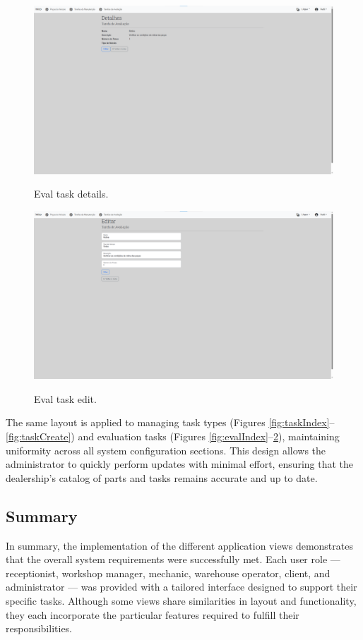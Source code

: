 \begin{figure}[h]
  \caption{Eval task details.}
  \centering
  \includegraphics[width=\textwidth]{figs/Implementation/dealershipAdmin/evalDetails}
  \label{fig:evalDetails}
\end{figure}

\begin{figure}[h]
  \caption{Eval task edit.}
  \centering
  \includegraphics[width=\textwidth]{figs/Implementation/dealershipAdmin/evalEdit}
  \label{fig:evalEdit}
\end{figure}

The same layout is applied to managing task types (Figures \ref{fig:taskIndex}–\ref{fig:taskCreate}) and evaluation tasks (Figures \ref{fig:evalIndex}–\ref{fig:evalEdit}), maintaining uniformity across all system configuration sections. This design allows the administrator to quickly perform updates with minimal effort, ensuring that the dealership's catalog of parts and tasks remains accurate and up to date.


\subsection{Summary}

In summary, the implementation of the different application views demonstrates that the overall system requirements were successfully met. Each user role — receptionist, workshop manager, mechanic, warehouse operator, client, and administrator — was provided with a tailored interface designed to support their specific tasks. Although some views share similarities in layout and functionality, they each incorporate the particular features required to fulfill their responsibilities. 







